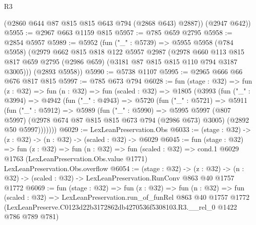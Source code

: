 \begin{lexlean}{R3}
\begin{coremodule}
        (@2860 @644 @87 @815 @815 @643 @794 (@2868 @643) @2887))
      (@2947 @642))
@5955 := @2967 @663 @1159 @815
@5957 := @785 @659 @2795
@5958 := @2854 @5957
@5989 := @5952
    (fun ("_" : @5739) =>
    @5955
      @5958
      (@784 @5958)
      (@2979
        @662
        @815
        @818
        @122
        @5957
        @2987
        (@2978
          @660
          @113
          @815
          @817
          @659
          @2795
          (@2986 @659)
          (@3181 @87 @815 @815 @110 @794 @3187 @3005)))
      (@2893 @5958))
@5990 := @5738 @1107
@5995 := @2965 @666 @66 @676 @817 @815
@5997 := @785 @673 @794
@6028 := fun (stage : @32) =>
  fun (z : @32) =>
  fun (n : @32) =>
  fun (scaled : @32) =>
  @1805
    (@3993
      (fun ("_" : @3994) =>
      @4942
        (fun ("_" : @4943) =>
        @5720
          (fun ("_" : @5721) =>
          @5911
            (fun ("_" : @5912) =>
            @5989
              (fun ("_" : @5990) =>
              @5995
                @5997
                (@807 @5997)
                (@2978 @674 @87 @815 @815 @673 @794 (@2986 @673) @3005)
                (@2892 @50 @5997)))))))
@6029 := LexLeanPreservation.Obs
@6033 := (stage : @32) -> (z : @32) -> (n : @32) -> (scaled : @32) -> @6029
@6045 := fun (stage : @32) =>
  fun (z : @32) =>
  fun (n : @32) =>
  fun (scaled : @32) =>
  cond.{1} @6029 @1763 (LexLeanPreservation.Obs.value @1771) LexLeanPreservation.Obs.overflow
@6054 := (stage : @32) ->
  (z : @32) -> (n : @32) -> (scaled : @32) -> LexLeanPreservation.RunConv @863 @40 @1757 @1772
@6069 := fun (stage : @32) =>
  fun (z : @32) =>
  fun (n : @32) =>
  fun (scaled : @32) =>
  LexLeanPreservation.run_of_funRel
    @863
    @40
    @1757
    @1772
    (LexLeanPreserve.C0123d22b3172862db4270536f5308103.R3.__rel_0 @1422 @786 @789 @781)
\end{coremodule}
\end{lexlean}
